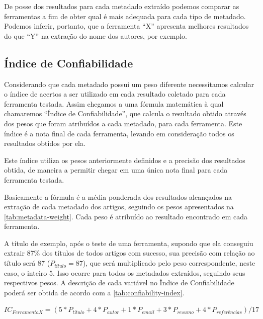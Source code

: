 De posse dos resultados para cada metadado extraído podemos comparar as ferramentas a fim de obter qual é mais adequada para cada tipo de metadado. Podemos inferir, portanto, que a ferramenta ``X'' apresenta melhores resultados do que ``Y'' na extração do nome dos autores, por exemplo.

\subsection{Índice de Confiabilidade}
\label{ssec:confiability-index}


Considerando que cada metadado possui um peso diferente necessitamos calcular o índice de acertos a ser utilizado em cada resultado coletado para cada ferramenta testada. Assim chegamos a uma fórmula matemática à qual chamaremos ``Índice de Confiabilidade'', que calcula o resultado obtido através dos pesos que foram atribuídos a cada metadado, para cada ferramenta. Este índice é a nota final de cada ferramenta, levando em consideração todos os resultados obtidos por ela.

Este índice utiliza os pesos anteriormente definidos e a precisão dos resultados obtida, de maneira a permitir chegar em uma única nota final para cada ferramenta testada.

Basicamente a fórmula é a média ponderada dos resultados alcançados na extração de cada metadado dos artigos, seguindo os pesos apresentados na \autoref{tab:metadata-weight}. Cada peso é atribuído ao resultado encontrado em cada ferramenta. 

A título de exemplo, após o teste de uma ferramenta, supondo que ela conseguiu extrair 87\% dos títulos de todos artigos com sucesso, sua precisão com relação ao título será 87 ($P_{título}=87$), que será multiplicado pelo peso correspondente, neste caso, o inteiro 5. Isso ocorre para todos os metadados extraídos, seguindo seus respectivos pesos. A descrição de cada variável no Índice de Confiabilidade poderá ser obtida de acordo com a \autoref{tab:confiability-index}.

\begin{center}
    $ IC_{Ferramenta X}=(5*P_{título}+4*P_{autor}+1*P_{email}+3*P_{resumo}+4*P_{referências}) / 17 $
\end{center}

